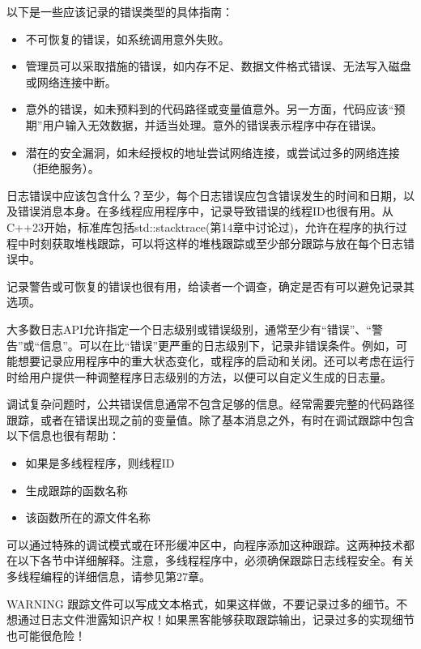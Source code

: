 以下是一些应该记录的错误类型的具体指南：

\begin{itemize}
\item
不可恢复的错误，如系统调用意外失败。

\item
管理员可以采取措施的错误，如内存不足、数据文件格式错误、无法写入磁盘或网络连接中断。

\item
意外的错误，如未预料到的代码路径或变量值意外。另一方面，代码应该“预期”用户输入无效数据，并适当处理。意外的错误表示程序中存在错误。

\item
潜在的安全漏洞，如未经授权的地址尝试网络连接，或尝试过多的网络连接（拒绝服务）。
\end{itemize}

日志错误中应该包含什么？至少，每个日志错误应包含错误发生的时间和日期，以及错误消息本身。在多线程应用程序中，记录导致错误的线程ID也很有用。从C++23开始，标准库包括std::stacktrace(第14章中讨论过)，允许在程序的执行过程中时刻获取堆栈跟踪，可以将这样的堆栈跟踪或至少部分跟踪与放在每个日志错误中。

记录警告或可恢复的错误也很有用，给读者一个调查，确定是否有可以避免记录其选项。

大多数日志API允许指定一个日志级别或错误级别，通常至少有“错误”、“警告”或“信息”。可以在比“错误”更严重的日志级别下，记录非错误条件。例如，可能想要记录应用程序中的重大状态变化，或程序的启动和关闭。还可以考虑在运行时给用户提供一种调整程序日志级别的方法，以便可以自定义生成的日志量。


调试复杂问题时，公共错误信息通常不包含足够的信息。经常需要完整的代码路径跟踪，或者在错误出现之前的变量值。除了基本消息之外，有时在调试跟踪中包含以下信息也很有帮助：

\begin{itemize}
\item
如果是多线程程序，则线程ID

\item
生成跟踪的函数名称

\item
该函数所在的源文件名称
\end{itemize}

可以通过特殊的调试模式或在环形缓冲区中，向程序添加这种跟踪。这两种技术都在以下各节中详细解释。注意，多线程程序中，必须确保跟踪日志线程安全。有关多线程编程的详细信息，请参见第27章。

\begin{myWarning}{WARNING}
跟踪文件可以写成文本格式，如果这样做，不要记录过多的细节。不想通过日志文件泄露知识产权！如果黑客能够获取跟踪输出，记录过多的实现细节也可能很危险！
\end{myWarning}

